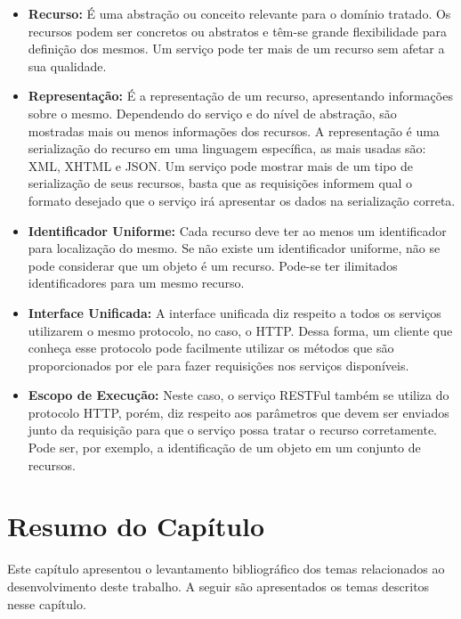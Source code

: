\begin{itemize}
	\item \textbf{Recurso:} É uma abstração ou conceito relevante para o domínio tratado. Os recursos podem ser concretos ou abstratos e têm-se grande flexibilidade para definição dos mesmos. Um serviço pode ter mais de um recurso sem afetar a sua qualidade.
	\item \textbf{Representação:} É a representação de um recurso, apresentando informações sobre o mesmo. Dependendo do serviço e do nível de abstração, são mostradas mais ou menos informações dos recursos. A representação é uma serialização do recurso em uma linguagem específica, as mais usadas são: XML, XHTML e JSON. Um serviço pode mostrar mais de um tipo de serialização de seus recursos, basta que as requisições informem qual o formato desejado que o serviço irá apresentar os dados na serialização correta.
	\item \textbf{Identificador Uniforme:} Cada recurso deve ter ao menos um identificador para localização do mesmo. Se não existe um identificador uniforme, não se pode considerar que um objeto é um recurso. Pode-se ter ilimitados identificadores para um mesmo recurso.
	\item \textbf{Interface Unificada:} A interface unificada diz respeito a todos os serviços utilizarem o mesmo protocolo, no caso, o HTTP. Dessa forma, um cliente que conheça esse protocolo pode facilmente utilizar os métodos que são proporcionados por ele para fazer requisições nos serviços disponíveis.
	\item \textbf{Escopo de Execução:} Neste caso, o serviço RESTFul também se utiliza do protocolo HTTP, porém, diz respeito aos parâmetros que devem ser enviados junto da requisição para que o serviço possa tratar o recurso corretamente. Pode ser, por exemplo, a identificação de um objeto em um conjunto de recursos.
\end{itemize}

\section{Resumo do Capítulo}
Este capítulo apresentou o levantamento bibliográfico dos temas relacionados ao desenvolvimento deste trabalho. A seguir são apresentados os temas descritos nesse capítulo.

